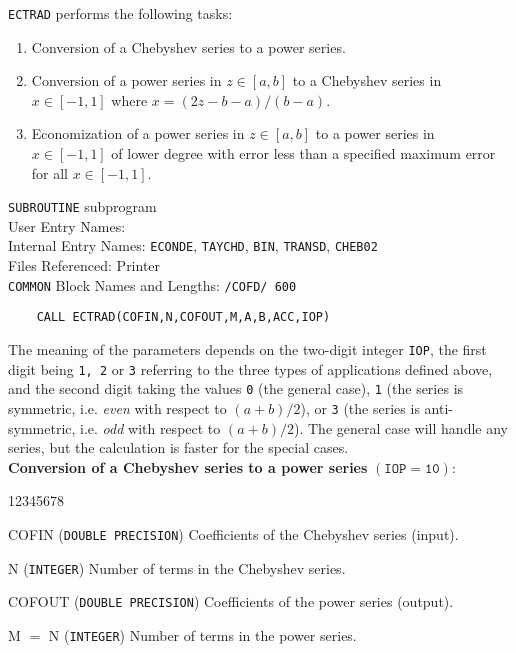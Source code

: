                       
                   
                    
                      
{\tt ECTRAD} performs the following tasks:
\begin{enumerate}
\item Conversion of a Chebyshev series to a power series.
\item Conversion of a power series in $z \in [a,b]$ to a
Chebyshev series in $x \in [-1,1]$ where $x=(2z-b-a)/(b-a)$.
\item Economization of a power series in $z \in [a,b]$
to a power series in $x \in [-1,1]$ of lower degree with error
less than a specified maximum error for all $x \in [-1,1]$.
\end{enumerate}
\Structure
{\tt SUBROUTINE} subprogram\\
User Entry Names: \\
Internal Entry Names: {\tt ECONDE}, {\tt TAYCHD}, {\tt BIN},
{\tt TRANSD}, {\tt CHEB02} \\
Files Referenced: Printer\\
{\tt COMMON} Block Names and Lengths: {\tt /COFD/ 600}
\Usage
\begin{verbatim}
    CALL ECTRAD(COFIN,N,COFOUT,M,A,B,ACC,IOP)
\end{verbatim}
The meaning of the parameters depends on the two-digit
integer {\tt IOP}, the first digit being {\tt 1, 2} or {\tt 3}
referring to the three types of applications defined above, and the
second digit taking the values {\tt 0} (the general case), {\tt 1}
(the series is symmetric, i.e. {\it even} with respect to $(a+b)/2$),
or {\tt 3} (the series is anti-symmetric, i.e. {\it odd} with respect
to $(a+b)/2$). The general case will handle any series, but the
calculation is faster for the special cases. \\[3mm]
{\bf Conversion of a Chebyshev series to a power series}
$(\mathtt{IOP=10})$:
\begin{DLtt}{12345678}
\item[COFIN] ({\tt DOUBLE PRECISION}) Coefficients of the Chebyshev
series (input).
\item[N] ({\tt INTEGER}) Number of terms in the Chebyshev series.
\item[COFOUT] ({\tt DOUBLE PRECISION}) Coefficients of the power
series (output).
\item[M $=$ N] ({\tt INTEGER}) Number of terms in the power series.
\end{DLtt}
